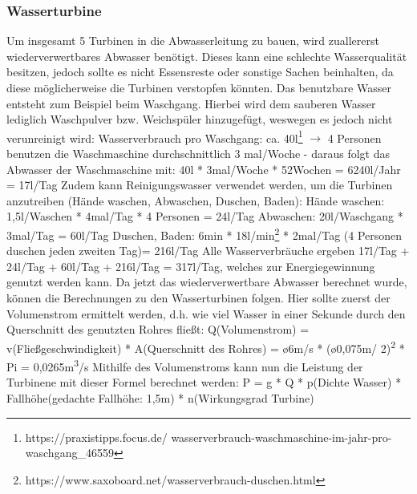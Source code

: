 \subsubsection{Wasserturbine}
Um insgesamt 5 Turbinen in die Abwasserleitung zu bauen, wird zuallererst wiederverwertbares
Abwasser benötigt. Dieses kann eine schlechte Wasserqualität besitzen, jedoch sollte es nicht
Essensreste oder sonstige Sachen beinhalten, da diese möglicherweise die Turbinen verstopfen
könnten. Das benutzbare Wasser entsteht zum Beispiel beim Waschgang. Hierbei wird dem
sauberen Wasser lediglich Waschpulver bzw. Weichspüler hinzugefügt, weswegen es jedoch nicht
verunreinigt wird:
\newline
Wasserverbrauch pro Waschgang: ca. 40l\footnote{https://praxistipps.focus.de/
wasserverbrauch-waschmaschine-im-jahr-pro-waschgang\_46559}
\newline
$\longrightarrow$ 4 Personen benutzen die Waschmaschine durchschnittlich 3 mal/Woche -
daraus folgt das Abwasser der Waschmaschine mit:
\newline
40l * 3mal/Woche * 52Wochen = 6240l/Jahr = 17l/Tag
\newline
Zudem kann Reinigungswasser verwendet werden, um die Turbinen anzutreiben (Hände waschen, Abwaschen, Duschen, Baden):
\newline
Hände waschen: 1,5l/Waschen * 4mal/Tag * 4 Personen = 24l/Tag
\newline
Abwaschen: 20l/Waschgang * 3mal/Tag = 60l/Tag
\newline
Duschen, Baden: 6min * 18l/min\footnote{https://www.saxoboard.net/wasserverbrauch-duschen.html} * 2mal/Tag (4 Personen duschen jeden zweiten Tag)= 216l/Tag
\newline
Alle Wasserverbräuche ergeben 17l/Tag + 24l/Tag + 60l/Tag + 216l/Tag = 317l/Tag, welches zur Energiegewinnung genutzt werden kann.
\newline
Da jetzt das wiederverwertbare Abwasser berechnet wurde, können die Berechnungen zu den
Wasserturbinen folgen. Hier sollte zuerst der Volumenstrom ermittelt werden, d.h. wie viel Wasser
in einer Sekunde durch den Querschnitt des genutzten Rohres fließt:
\newline
Q(Volumenstrom) = v(Fließgeschwindigkeit) * A(Querschnitt des Rohres) = ø6m/s * (ø0,075m/
2)\textsuperscript{2} * Pi = 0,0265m\textsuperscript{3}/s
\newline
Mithilfe des Volumenstroms kann nun die Leistung der Turbinene mit dieser Formel berechnet
werden:
\newline
P = g * Q * p(Dichte Wasser) * Fallhöhe(gedachte Fallhöhe: 1,5m) * n(Wirkungsgrad Turbine)
